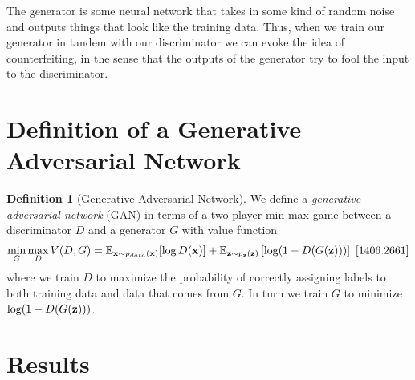 \documentclass[12pt]{amsart}
\theoremstyle{definition}
\newtheorem{definition}[theorem]{Definition}
\theoremstyle{remark}
\begin{document}
The generator is some neural network that takes in some kind
of random noise and outputs things that look like the training
data. Thus, when we train our generator in tandem with our
discriminator we can evoke the idea of counterfeiting, in the
sense that the outputs of the generator try to fool
the input to the discriminator.

\section{Definition of a Generative Adversarial Network}

\begin{definition}[Generative Adversarial Network]
        We define a {\em generative adversarial network} (GAN) in terms of a
        two player min-max game between a discriminator $D$ and a
        generator $G$ with value function
        \begin{align*}
                \min\limits_{G}\max\limits_{D}V(D,G) = \mathbb{E}_{{\bf x} \sim p_{data}({\bf x})}[\log D({\bf x})] + 
                \mathbb{E}_{{\bf z} \sim p_{{\bf z}}({\bf z}) } \left[ \log(1-D(G({\bf z}))) \right]\text{  \cite{1406.2661}}
        \end{align*}
        where we train $D$ to maximize the probability of correctly assigning
        labels to both training data and data that comes from $G$. In turn we train $G$
        to minimize $\log(1-D(G({\bf z})))$.
\end{definition}

\section{Results}
\end{document}
